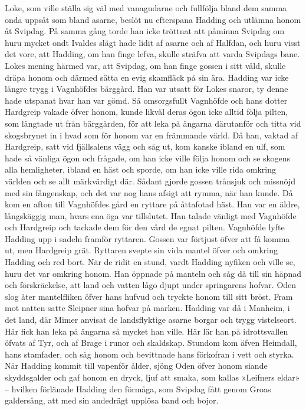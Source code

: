 Loke, som ville ställa sig väl med vanagudarne och fullfölja bland dem
samma onda uppsåt som bland asarne, beslöt nu efterspana Hadding och
utlämna honom åt Svipdag. På samma gång torde han icke tröttnat att
påminna Svipdag om huru mycket ondt Ivaldes slägt hade lidit af asarne
och af Halfdan, och huru visst det vore, att Hadding, om han finge
lefva, skulle sträfva att varda Svipdags bane. Lokes mening härmed var,
att Svipdag, om han finge gossen i sitt våld, skulle dräpa honom och
därmed sätta en evig skamfläck på sin ära. Hadding var icke längre trygg
i Vagnhöfdes bärggård. Han var utsatt för Lokes snaror, ty denne hade
utspanat hvar han var gömd. Så omsorgsfullt Vagnhöfde och hans dotter
Hardgreip vakade öfver honom, kunde likväl deras
\protect\hypertarget{lb1625905.xhtmlux5cux23start154}{}{}\protect\hypertarget{lb1625905.xhtmlux5cux23start154-a}{}{}\protect\hypertarget{lb1625905.xhtmlux5cux23start154-b}{}{}\protect\hypertarget{lb1625905.xhtmlux5cux23start154-c}{}{}\protect\hypertarget{lb1625905.xhtmlux5cux23start154-d}{}{}
ögon icke alltid följa pilten, som längtade ut från bärggården, för att
leka på ängarna därutanför och titta vid skogsbrynet in i hvad som för
honom var en främmande värld. Då han, vaktad af Hardgreip, satt vid
fjällsalens vägg och såg ut, kom kanske ibland en ulf, som hade så
vänliga ögon och frågade, om han icke ville följa honom och se skogens
alla hemligheter, ibland en häst och sporde, om han icke ville rida
omkring världen och se allt märkvärdigt där. Sådant gjorde gossen
trånsjuk och missnöjd med sin fångenskap, och det var nog hans afsigt
att rymma, när han kunde. Då kom en afton till Vagnhöfdes gård en
ryttare på åttafotad häst. Han var en äldre, långskäggig man, hvars ena
öga var tillslutet. Han talade vänligt med Vagnhöfde och Hardgreip och
tackade dem för den vård de egnat pilten. Vagnhöfde lyfte Hadding upp i
sadeln framför ryttaren. Gossen var förtjust öfver att få komma ut, men
Hardgreip grät. Ryttaren svepte sin vida mantel öfver och omkring
Hadding och red bort. När de ridit en stund, vardt Hadding nyfiken och
ville se, huru det var omkring honom. Han öppnade på manteln och såg då
till sin häpnad och förskräckelse, att land och vatten lågo djupt under
springarens hofvar. Oden slog åter mantelfliken öfver hans hufvud och
tryckte honom till sitt bröst. Fram mot natten satte Sleipner sina
hofvar på marken. Hadding var då i Manheim, i det land, där Mimer
anvisat de landsflyktige asarne borgar och trygg vistelseort. Här fick
han leka på ängarna så mycket han ville. Här lär han på idrottsvallen
öfvats af Tyr, och af Brage i runor och skaldskap. Stundom kom äfven
Heimdall, hans stamfader, och såg honom och bevittnade hans förkofran i
vett och styrka. När Hadding kommit till vapenför ålder, sjöng Oden
öfver honom siande skyddsgalder och gaf honom en dryck, ljuf att smaka,
som kallas »Leifners eldar» -- hvilken förlänade Hadding den förmåga,
som Svipdag fått genom Groas galdersång, att med sin andedrägt upplösa
band och bojor.

